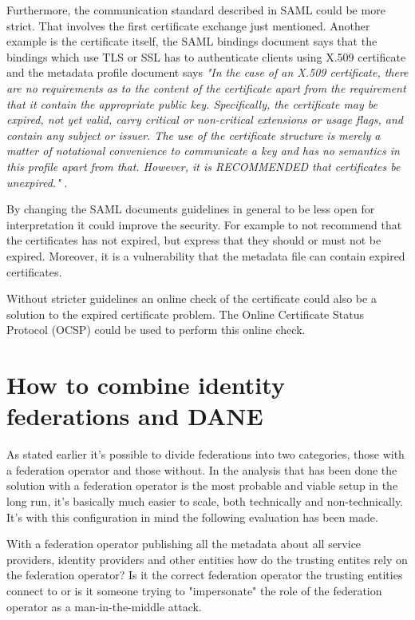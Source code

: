Furthermore, the communication standard described in SAML could be more strict.
That involves the first certificate exchange just mentioned. 
Another example is the certificate itself, the SAML bindings document says  
that the bindings which use TLS or SSL has to authenticate clients using X.509 certificate \cite[p.~8]{pdf:oasis-open-bindings} and the metadata profile document says
\emph{"In the case of an X.509 certificate, there are no requirements as to the content of the certificate apart from the requirement 
that it contain the appropriate public key. 
Specifically, the certificate may be expired, not yet valid, carry critical or non-critical extensions or usage flags, and contain 
any subject or issuer. 
The use of the certificate structure is merely a matter of notational convenience to communicate a key and has no semantics in this 
profile apart from that. 
However, it is RECOMMENDED that certificates be unexpired."} \cite[p.~11]{pdf:oasis-open-metadata-profile}. 

By changing the SAML documents guidelines in general to be less open for interpretation it could improve the security. 
For example to not recommend that the certificates has not expired, but express that they should or must not be expired. 
Moreover, it is a vulnerability that the metadata file can contain expired certificates.

Without stricter guidelines an online check of the certificate could also be a solution to the expired certificate problem. 
The Online Certificate Status Protocol (OCSP) \cite{rfc:6277} could be used to perform this online check.

\section{How to combine identity federations and DANE}
As stated earlier it's possible to divide federations into two categories, those with a federation operator and those without.
In the analysis that has been done the solution with a federation operator is the most probable and viable setup in the long run, it's basically much easier to scale, both technically and non-technically.
It's with this configuration in mind the following evaluation has been made.


With a federation operator publishing all the metadata about all service providers, identity providers and other entities how do the trusting entites rely on the federation operator?
Is it the correct federation operator the trusting entities connect to or is it someone trying to "impersonate" the role of the federation operator as a man-in-the-middle attack.

